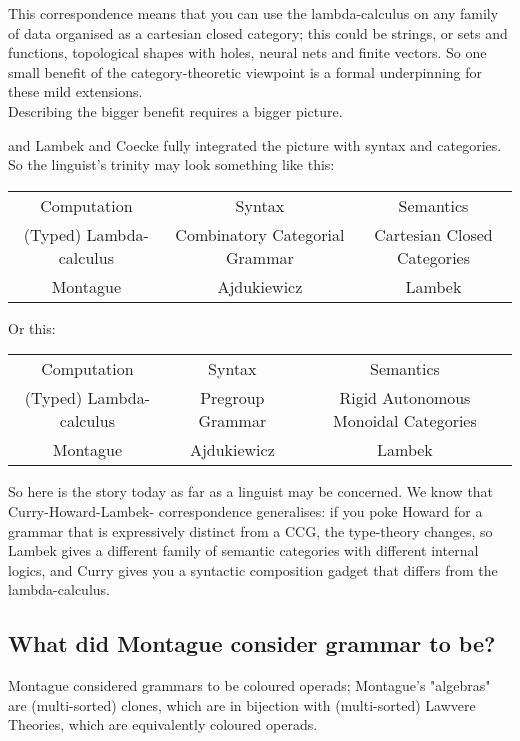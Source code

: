 This correspondence means that you can use the lambda-calculus on any family of data organised as a cartesian closed category; this could be strings, or sets and functions, topological shapes with holes, neural nets and finite vectors. So one small benefit of the category-theoretic viewpoint is a formal underpinning for these mild extensions.\\

Describing the bigger benefit requires a bigger picture. 


and Lambek and Coecke fully integrated the picture with syntax and categories. So the linguist's trinity may look something like this:

\begin{table}[]
\begin{tabular}{ccc}
Computation & Syntax & Semantics \\
(Typed) Lambda-calculus & Combinatory Categorial Grammar & Cartesian Closed Categories \\
Montague & Ajdukiewicz & Lambek
\end{tabular}
\end{table}

Or this:

\begin{table}[]
\begin{tabular}{ccc}
Computation & Syntax & Semantics \\
(Typed) Lambda-calculus & Pregroup Grammar & Rigid Autonomous Monoidal Categories \\
Montague & Ajdukiewicz & Lambek
\end{tabular}
\end{table}

So here is the story today as far as a linguist may be concerned. We know that Curry-Howard-Lambek- correspondence generalises: if you poke Howard for a grammar that is expressively distinct from a CCG, the type-theory changes, so Lambek gives a different family of semantic categories with different internal logics, and Curry gives you a syntactic composition gadget that differs from the lambda-calculus.

\subsection{What did Montague consider grammar to be?}\label{sec:monty}

 Montague considered grammars to be coloured operads; Montague's "algebras" are (multi-sorted) clones, which are in bijection with (multi-sorted) Lawvere Theories, which are equivalently coloured operads.

